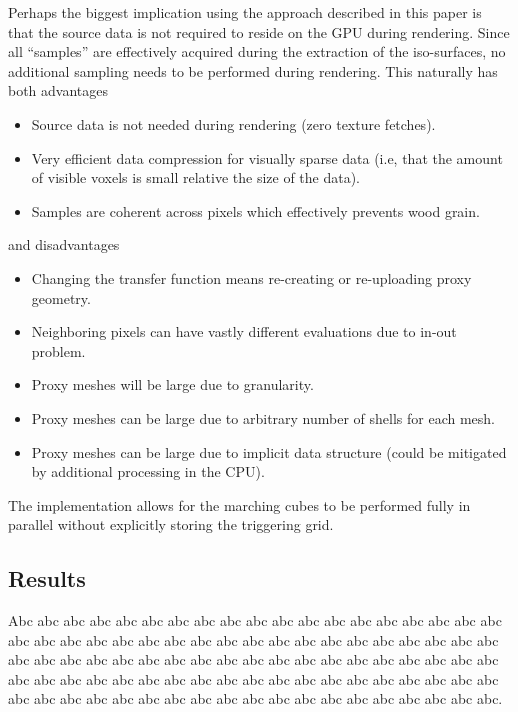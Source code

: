 \documentclass{egpubl}
\begin{document}
Perhaps the biggest implication using the approach described in this paper is that the source data is not required to reside on the GPU during rendering. Since all ``samples'' are effectively acquired during the extraction of the iso-surfaces, no additional sampling needs to be performed during rendering. This naturally has both advantages 
\begin{itemize}\renewcommand{\labelitemi}{$+$}
\item Source data is not needed during rendering (zero texture fetches).
\item Very efficient data compression for visually sparse data (i.e, that the amount of visible voxels is small relative the size of the data).
\item Samples are coherent across pixels which effectively prevents wood grain.
\end{itemize}
and disadvantages 
\begin{itemize}\renewcommand{\labelitemi}{$-$}
\item Changing the transfer function means re-creating or re-uploading proxy geometry.
\item Neighboring pixels can have vastly different evaluations due to in-out problem.
\item Proxy meshes will be large due to granularity.
\item Proxy meshes can be large due to arbitrary number of  shells for each mesh.
\item Proxy meshes can be large due to implicit data structure (could be mitigated by additional processing in the CPU).
\end{itemize}
The implementation allows for the marching cubes to be performed fully in parallel without explicitly storing the triggering grid. 


\subsection{Results}

   Abc abc abc abc abc abc abc abc abc abc abc abc abc abc abc abc abc abc abc abc abc abc abc abc abc abc abc abc abc abc abc abc abc abc abc abc abc abc abc abc abc abc abc abc abc abc abc abc abc abc abc abc abc abc abc abc abc abc abc abc abc abc abc abc abc abc abc abc abc abc abc abc abc abc abc abc abc abc abc abc abc abc abc abc abc abc abc abc abc abc abc abc abc abc abc.

\end{document}
